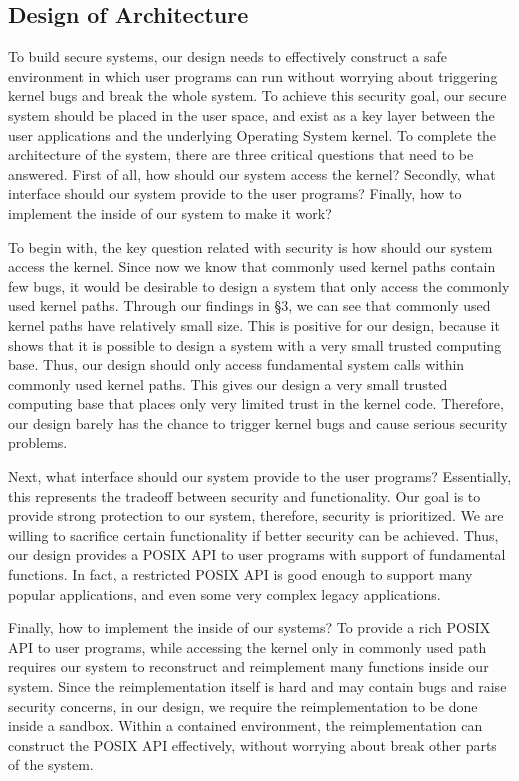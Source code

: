 \subsection{Design of Architecture}
To build secure systems, our design needs to effectively construct a safe environment in which user programs 
can run without worrying about triggering kernel bugs and break the whole system. To achieve this security goal, 
our secure system should be placed in the user space, and exist as a key layer between the user applications 
and the underlying Operating System kernel. To complete the architecture of the system, there are three critical 
questions that need to be answered. First of all, how should our system access the kernel? Secondly, what interface 
should our system provide to the user programs? Finally, how to implement the inside of our system to make it work?

To begin with, the key question related with security is how should our system access the kernel. Since now we know 
that commonly used kernel paths contain few bugs, it would be desirable to design a system that only access the 
commonly used kernel paths. Through our findings in \S{3}, we can see that commonly used kernel paths have relatively 
small size. This is positive for our design, because it shows that it is possible to design a system with a very small 
trusted computing base. Thus, our design should only access fundamental system calls within commonly used kernel paths. 
This gives our design a very small trusted computing base that places only very limited trust in the kernel code. Therefore, 
our design barely has the chance to trigger kernel bugs and cause serious security problems. 

Next, what interface should our system provide to the user programs? Essentially, this represents the tradeoff between 
security and functionality. Our goal is to provide strong protection to our system, therefore, security is prioritized. We are willing 
to sacrifice certain functionality if better security can be achieved. Thus, our design provides a POSIX API to user programs with 
support of fundamental functions. In fact, a restricted POSIX API is good enough to support many popular applications, 
and even some very complex legacy applications. 

Finally, how to implement the inside of our systems? 
To provide a rich POSIX API to user programs, while accessing the kernel only in commonly used path requires our system to 
reconstruct and reimplement many functions inside our system. Since the reimplementation itself is hard and may contain bugs 
and raise security concerns, in our design, we require the reimplementation to be done inside a sandbox. Within a contained 
environment, the reimplementation can construct the POSIX API effectively, without worrying about break other parts of the system.  

